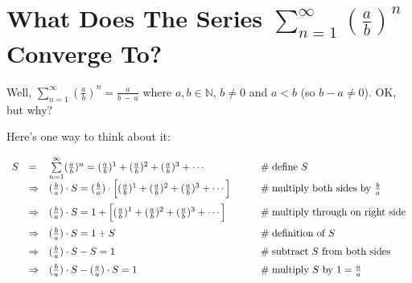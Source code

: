\documentclass[11pt, oneside]{article}   	%
\begin{document}
\section*{What Does The Series $\sum\limits_{n = 1}^\infty (\frac{a}{b})^n $ Converge To?}

\noindent
Well,  $\sum\limits_{n = 1}^\infty (\frac{a}{b})^n  = \frac{a}{b \:-\: a}$ where $a,b \in \mathbb{N}$, $b \neq 0$ and $a < b$ (so $b - a \neq 0$). OK, but why?

\bigskip
\noindent
 Here's one way to think about it:  
      
\begin{equation*}
\begin{array}{lllll}
S
&=& \sum\limits_{n = 1}^\infty (\frac{a}{b})^n = (\frac{a}{b})^1 + (\frac{a}{b})^2 + (\frac{a}{b})^3 + \cdots                                                                                                                      &\qquad  \mathrel{\#} \text{define $S$}                                          \\ 
\vspace{2.0mm}
&\Rightarrow& (\frac{b}{a}) \cdot S = (\frac{b}{a}) \cdot \Big [(\frac{a}{b})^1 + (\frac{a}{b})^2 + (\frac{a}{b})^3 + \cdots \Big ]   &\qquad  \mathrel{\#} \text{multiply both sides by $\frac{b}{a}$}      \\
\vspace{2.0mm}
&\Rightarrow&  (\frac{b}{a}) \cdot S = 1 + \Big [(\frac{a}{b})^1 + (\frac{a}{b})^2 + (\frac{a}{b})^3 + \cdots \Big ]                        &\qquad  \mathrel{\#} \text{multiply through on right side}                \\
\vspace{2.0mm}
&\Rightarrow&  (\frac{b}{a}) \cdot S = 1 + S                                                                                                                              &\qquad  \mathrel{\#} \text{definition of $S$}                                     \\
\vspace{2.0mm}
&\Rightarrow&  (\frac{b}{a}) \cdot S - S = 1                                                                                                                               &\qquad  \mathrel{\#} \text{subtract $S$ from both sides}                 \\
\vspace{2.0mm}
&\Rightarrow&  (\frac{b}{a}) \cdot S - (\frac{a}{a}) \cdot S = 1                                                                                                   &\qquad  \mathrel{\#} \text{multiply $S$ by $1 = \frac{a}{a}$}            \\

\end{array}
\end{equation*}
\end{document}
